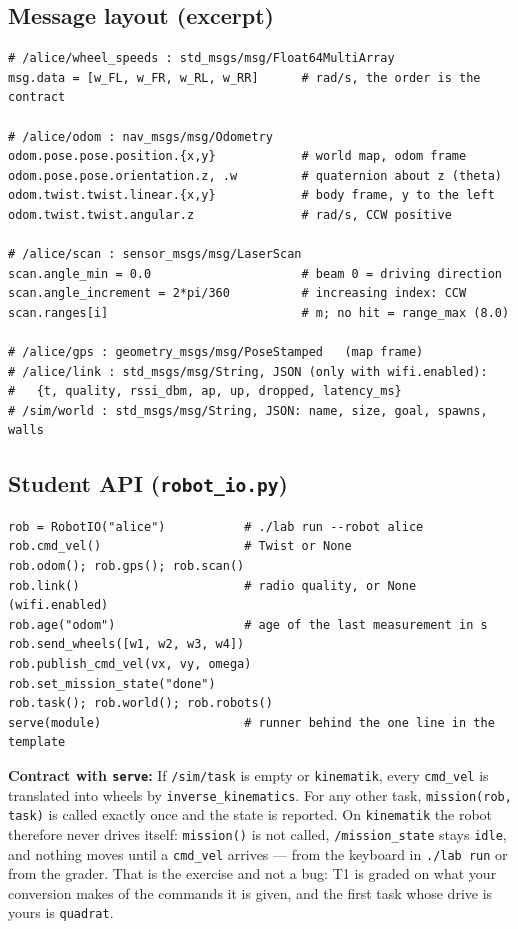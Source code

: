 \documentclass[12pt,a4paper]{scrartcl}
\newcommand{\thema}[1]{\texttt{#1}}
\newcommand{\ordner}[1]{\texttt{#1}}
\newcommand{\kommando}[1]{\texttt{#1}}
\begin{document}
\subsection*{Message layout (excerpt)}
\begin{lstlisting}
# /alice/wheel_speeds : std_msgs/msg/Float64MultiArray
msg.data = [w_FL, w_FR, w_RL, w_RR]      # rad/s, the order is the contract

# /alice/odom : nav_msgs/msg/Odometry
odom.pose.pose.position.{x,y}            # world map, odom frame
odom.pose.pose.orientation.z, .w         # quaternion about z (theta)
odom.twist.twist.linear.{x,y}            # body frame, y to the left
odom.twist.twist.angular.z               # rad/s, CCW positive

# /alice/scan : sensor_msgs/msg/LaserScan
scan.angle_min = 0.0                     # beam 0 = driving direction
scan.angle_increment = 2*pi/360          # increasing index: CCW
scan.ranges[i]                           # m; no hit = range_max (8.0)

# /alice/gps : geometry_msgs/msg/PoseStamped   (map frame)
# /alice/link : std_msgs/msg/String, JSON (only with wifi.enabled):
#   {t, quality, rssi_dbm, ap, up, dropped, latency_ms}
# /sim/world : std_msgs/msg/String, JSON: name, size, goal, spawns, walls
\end{lstlisting}
\subsection*{Student API (\texorpdfstring{\ordner{robot\_io.py}}{robot_io.py})}
\begin{lstlisting}
rob = RobotIO("alice")           # ./lab run --robot alice
rob.cmd_vel()                    # Twist or None
rob.odom(); rob.gps(); rob.scan()
rob.link()                       # radio quality, or None (wifi.enabled)
rob.age("odom")                  # age of the last measurement in s
rob.send_wheels([w1, w2, w3, w4])
rob.publish_cmd_vel(vx, vy, omega)
rob.set_mission_state("done")
rob.task(); rob.world(); rob.robots()
serve(module)                    # runner behind the one line in the template
\end{lstlisting}
\textbf{Contract with \thema{serve}:} If \thema{/sim/task} is empty or
\thema{kinematik}, every \thema{cmd\_vel} is translated into wheels by
\thema{inverse\_kinematics}. For any other task, \thema{mission(rob,
task)} is called exactly once and the state is reported. On \thema{kinematik} the robot therefore never
drives itself: \thema{mission()} is not called, \thema{/mission\_state} stays \thema{idle}, and nothing
moves until a \thema{cmd\_vel} arrives --- from the keyboard in \kommando{./lab run} or from the grader.
That is the exercise and not a bug: T1 is graded on what your conversion makes of the commands it is
given, and the first task whose drive is yours is \thema{quadrat}.
\end{document}

